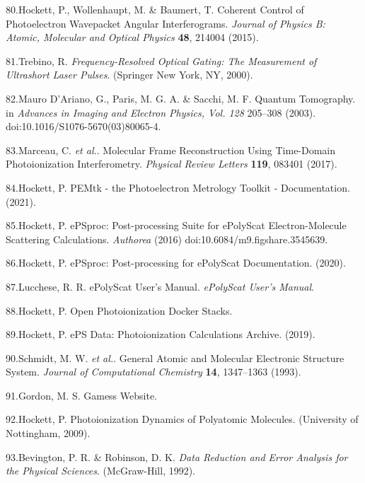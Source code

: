 \documentclass[10pt]{article}
\begin{document}
\label{csl:80}80.Hockett, P., Wollenhaupt, M. \& Baumert, T. {Coherent Control of Photoelectron Wavepacket Angular Interferograms}. \textit{Journal of Physics B: Atomic, Molecular and Optical Physics} \textbf{48}, 214004 (2015).

\label{csl:81}81.Trebino, R. \textit{{Frequency-{{Resolved Optical Gating}}: {{The Measurement}} of {{Ultrashort Laser Pulses}}}}. ({Springer New York, NY}, 2000).

\label{csl:82}82.Mauro D'Ariano, G., Paris, M. G. A. \& Sacchi, M. F. {Quantum {{Tomography}}}. in \textit{Advances in {{Imaging}} and {{Electron Physics}}, {{Vol}}. 128} 205–308 (2003). doi:10.1016/S1076-5670(03)80065-4.

\label{csl:83}83.Marceau, C. \textit{et al.}. {Molecular {{Frame Reconstruction Using Time-Domain Photoionization Interferometry}}}. \textit{Physical Review Letters} \textbf{119}, 083401 (2017).

\label{csl:84}84.Hockett, P. {{{PEMtk}} - the {{Photoelectron Metrology Toolkit}} - Documentation}. (2021).

\label{csl:85}85.Hockett, P. {{{ePSproc}}: {{Post-processing}} Suite for {{ePolyScat}} Electron-Molecule Scattering Calculations}. \textit{Authorea} (2016) doi:10.6084/m9.figshare.3545639.

\label{csl:86}86.Hockett, P. {{{ePSproc}}: {{Post-processing}} for {{ePolyScat}} Documentation}. (2020).

\label{csl:87}87.Lucchese, R. R. {{{ePolyScat User}}'s {{Manual}}}. \textit{ePolyScat User's Manual}.

\label{csl:88}88.Hockett, P. {Open {{Photoionization Docker Stacks}}}.

\label{csl:89}89.Hockett, P. {{{ePS}} Data: {{Photoionization}} Calculations Archive}. (2019).

\label{csl:90}90.Schmidt, M. W. \textit{et al.}. {General Atomic and Molecular Electronic Structure System}. \textit{Journal of Computational Chemistry} \textbf{14}, 1347–1363 (1993).

\label{csl:91}91.Gordon, M. S. {Gamess Website}.

\label{csl:92}92.Hockett, P. {Photoionization Dynamics of Polyatomic Molecules}. (University of Nottingham, 2009).

\label{csl:93}93.Bevington, P. R. \& Robinson, D. K. \textit{{Data {{Reduction}} and {{Error Analysis}} for the {{Physical Sciences}}}}. ({McGraw-Hill}, 1992).
\end{document}
